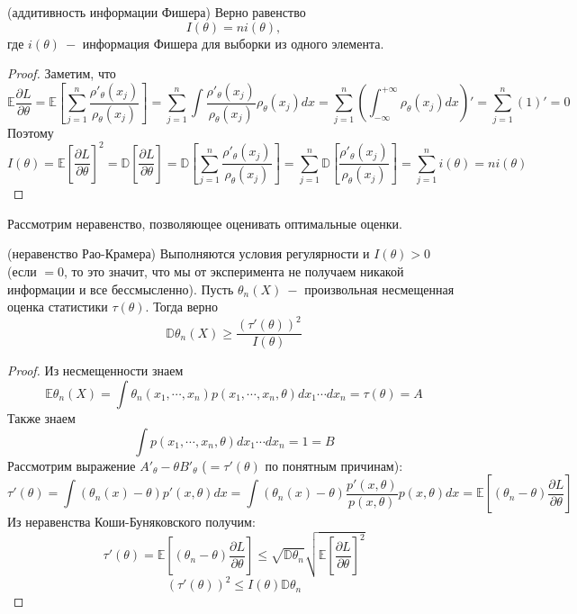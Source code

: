 \begin{advice}(аддитивность информации Фишера) Верно равенство
\[
    I\left(\theta\right) = n i\left(\theta\right),
\]
где $i\left(\theta\right) \ - $ информация Фишера для выборки из одного элемента.
\end{advice}
\begin{proof}
Заметим, что 
\[
    \mathbb{E} \frac{\partial L}{\partial \theta} = \mathbb{E}\left[\sum_{j = 1}^{n} \frac{\rho'_\theta\left(x_j\right)}{\rho_\theta\left(x_j\right)}\right] = \sum_{j =1}^{n} \int \frac{\rho'_\theta\left(x_j\right)}{\rho_\theta\left(x_j\right)} \rho_\theta\left(x_j\right) dx = 
    \sum_{j = 1}^{n} \left(\int_{-\infty}^{+\infty} \rho_\theta\left(x_j\right) dx\right)' = \sum_{j = 1}^{n} \left(1\right)' = 0
\]
Поэтому 
\[
    I\left(\theta\right) = \mathbb{E} \left[\frac{\partial L}{\partial \theta}\right] ^ 2 = \mathbb{D} \left[\frac{\partial L}{\partial \theta}\right] = \mathbb{D} \left[\sum_{j = 1}^{n} \frac{\rho'_\theta\left(x_j\right)}{\rho_\theta\left(x_j\right)}\right] = \sum_{j = 1}^n \mathbb{D} \left[\frac{\rho'_\theta\left(x_j\right)}{\rho_\theta\left(x_j\right)}\right] = \sum_{j = 1}^n i\left(\theta\right) = ni\left(\theta\right)
\]
\end{proof}

Рассмотрим неравенство, позволяющее оценивать оптимальные оценки.
\begin{theorem} (неравенство Рао-Крамера) Выполняются условия регулярности и $I\left(\theta\right) > 0$ (если $= 0$, то это значит, что мы от эксперимента не получаем никакой информации и все бессмысленно). Пусть $\theta_n\left(X\right) \ - $ произвольная несмещенная оценка статистики $\tau\left(\theta\right)$. Тогда верно
\[
    \mathbb{D} \theta_n\left(X\right) \geq \frac{\left(\tau'\left(\theta\right)\right) ^ 2}{I\left(\theta\right)}
\]
\end{theorem}
\begin{proof}
Из несмещенности знаем 
\[
    \mathbb{E} \theta_n\left(X\right) = \int \theta_n\left(x_1, \cdots, x_n\right) p\left(x_1, \cdots, x_n, \theta\right) dx_1 \cdots d x_n = \tau\left(\theta\right) = A
\]
Также знаем
\[
    \int p\left(x_1, \cdots, x_n, \theta\right) dx_1 \cdots d x_n = 1 = B
\]
Рассмотрим выражение $A'_\theta - \theta B'_\theta$ ($= \tau'\left(\theta\right)$ по понятным причинам):
\[
    \tau'\left(\theta\right) = \int \left(\theta_n\left(x\right) - \theta\right) p'\left(x, \theta\right) dx = \int \left(\theta_n\left(x\right) - \theta\right) \frac{p'\left(x, \theta\right)}{p\left(x, \theta\right)} p\left(x, \theta\right) dx = \mathbb{E} \left[\left(\theta_n - \theta\right) \frac{\partial L}{\partial \theta}\right]
\]
Из неравенства Коши-Буняковского получим: 
\[
    \tau'\left(\theta\right) = \mathbb{E} \left[\left(\theta_n - \theta\right) \frac{\partial L}{\partial \theta}\right] \leq \sqrt{\mathbb{D} \theta_n} \sqrt{\mathbb{E} \left[\frac{\partial L}{\partial \theta}\right] ^ 2}
\]\[
    \left(\tau'\left(\theta\right)\right) ^ 2 \leq I\left(\theta\right)\mathbb{D} \theta_n 
\]
\end{proof}

